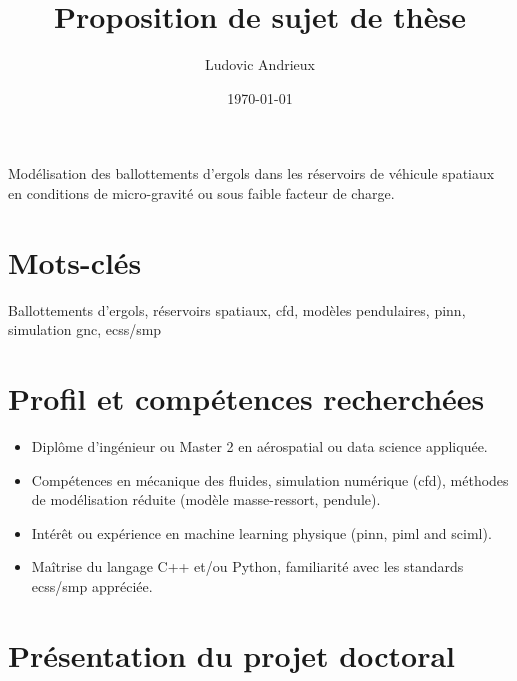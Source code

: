 \documentclass[12pt]{article}
\title{Proposition de sujet de thèse}
\author{Ludovic Andrieux}
\date{\today}
\begin{document}
	\maketitle
	
	\begin{tcolorbox}[colback=gray!0, colframe=black, sharp corners, boxrule=0.5pt]
	Modélisation des ballottements d’ergols dans les réservoirs de véhicule spatiaux en conditions de micro-gravité ou sous faible facteur de charge.
	\end{tcolorbox}
	
	\section*{Mots-clés}
	
	Ballottements d'ergols, réservoirs spatiaux, \acrshort{cfd}, modèles pendulaires, \acrshort{pinn}, simulation \acrshort{gnc}, \acrshort{ecss}/\acrshort{smp}
	
	\section*{Profil et compétences recherchées}
	
	\begin{itemize}
		\item Diplôme d’ingénieur ou Master 2 en aérospatial ou data science appliquée.
		
		\item Compétences en mécanique des fluides, simulation numérique (\acrshort{cfd}), méthodes de modélisation réduite (modèle masse-ressort, pendule).
		
		\item Intérêt ou expérience en machine learning physique (\acrshort{pinn}, \acrshort{piml} and \acrshort{sciml}).
		
		\item Maîtrise du langage C++ et/ou Python, familiarité avec les standards \acrshort{ecss}/\acrshort{smp} appréciée.
	\end{itemize}
	
	
	\section*{Présentation du projet doctoral}
	
\end{document}
